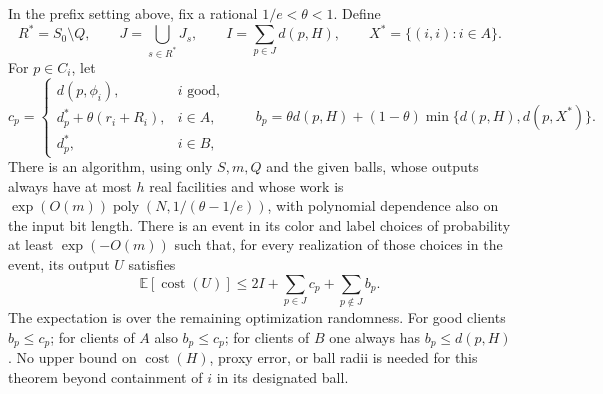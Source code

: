 \begin{theorem}
\label{comp:completion}
In the prefix setting above, fix a rational $1/e<\theta<1$.  Define
\[
 R^*=S_0\setminus Q,\qquad
 J=\bigcup_{s\in R^*}J_s,\qquad
 I=\sum_{p\in J}d(p,H),\qquad
 X^*=\{(i,i):i\in A\}.
\]
For $p\in C_i$, let
\begin{equation}
 c_p=\begin{cases}
 d(p,\phi_i),&i\text{ good},\\
 d_p^*+\theta(r_i+R_i),&i\in A,\\
 d_p^*,&i\in B,
 \end{cases}
 \qquad
 b_p=\theta d(p,H)+(1-\theta)\min\{d(p,H),d(p,X^*)\}.
 \label{comp:client-charges}
\end{equation}
There is an algorithm, using only $S,m,Q$ and the given balls, whose
outputs always have at most $h$ real facilities and whose work is
$\exp(O(m))\operatorname{poly}(N,1/(\theta-1/e))$, with polynomial
dependence also on the input bit length.  There is an event in its
color and label choices of probability at least $\exp(-O(m))$ such
that, for every realization of those choices in the event, its output
$U$ satisfies
\begin{equation}
 \mathbb E[\operatorname{cost}(U)]
       \le 2I+\sum_{p\in J}c_p+\sum_{p\notin J}b_p.
 \label{comp:completion-bound}
\end{equation}
The expectation is over the remaining optimization randomness.  For
good clients $b_p\le c_p$; for clients of $A$ also $b_p\le c_p$; for
clients of $B$ one always has $b_p\le d(p,H)$.  No upper bound on
$\operatorname{cost}(H)$, proxy error, or ball radii is needed for this
theorem beyond containment of $i$ in its designated ball.
\end{theorem}

